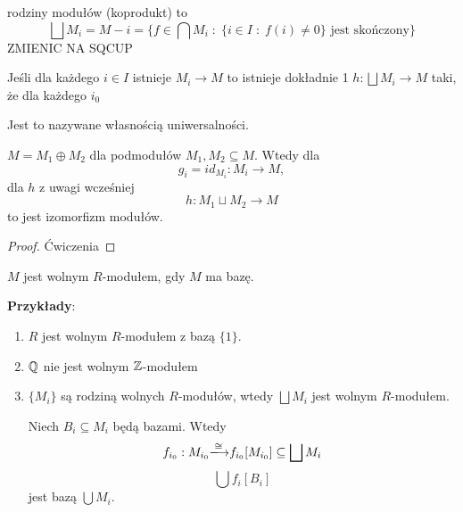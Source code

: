 \begin{bbox}
 rodziny modułów (koprodukt) to
$$\bigsqcup M_i= M-i=\{f\in\bigcap M_i\;:\;\{i\in I\;:\;f(i)\neq 0\}\text{ jest skończony}\}$$
{\large\color{orange}ZMIENIC NA SQCUP}
\end{bbox}

\begin{remark}
Jeśli dla każdego $i\in I$ istnieje $M_i\to M$ to istnieje dokładnie 1 $h:\bigsqcup M_i\to M$ taki, że dla każdego $i_0$

\begin{center}\end{center}

Jest to nazywane własnością uniwersalności.
\end{remark}

\begin{remark}
$M=M_1\oplus M_2$ dla podmodułów $M_1,M_2\subseteq M$. Wtedy dla 
$$g_i=id_{M_i}:M_i\to M,$$ 
dla $h$ z uwagi wcześniej
$$h:M_1\sqcup M_2\to M$$
to jest izomorfizm modułów.
\end{remark}
\begin{proof}
Ćwiczenia
\end{proof}

\begin{definition}
$M$ jest wolnym $R$-modułem, gdy $M$ ma bazę.
\end{definition}

\textbf{Przykłady}:

\begin{enumerate}
    \item $R$ jest wolnym $R$-modułem z bazą $\{1\}$. 
    \item $\mathbb{Q}$ nie jest wolnym $\mathbb{Z}$-modułem
    \item $\{M_i\}$ są rodziną wolnych $R$-modułów, wtedy $\bigsqcup M_i$ jest wolnym $R$-modułem.

    Niech $B_i\subseteq M_i$ będą bazami. Wtedy 
    $$f_{i_0}:M_{i_0}\isomorphism f_{i_0}[M_{i_0}]\subseteq\bigsqcup M_i$$
    $$\bigcup f_i[B_i]$$
    jest bazą $\bigcup M_i$.
\end{enumerate}

